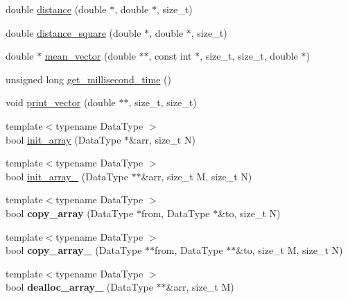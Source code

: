 \begin{DoxyCompactItemize}
\item 
double \hyperlink{namespaceSimpleCluster_a32994022b5f131b488b98d00fdb40a1f}{distance} (double $\ast$, double $\ast$, size\-\_\-t)
\item 
double \hyperlink{namespaceSimpleCluster_a2b7cf8225bcc829f7f0717292d49e0f0}{distance\-\_\-square} (double $\ast$, double $\ast$, size\-\_\-t)
\item 
double $\ast$ \hyperlink{namespaceSimpleCluster_a88d267f1612b952f290e0b3861360d53}{mean\-\_\-vector} (double $\ast$$\ast$, const int $\ast$, size\-\_\-t, size\-\_\-t, double $\ast$)
\item 
unsigned long \hyperlink{namespaceSimpleCluster_a00c790e51730b0e775438fe6c5ccc2c6}{get\-\_\-millisecond\-\_\-time} ()
\item 
void \hyperlink{namespaceSimpleCluster_ad04f5b6a882a4eea162fbf4eddc1246c}{print\-\_\-vector} (double $\ast$$\ast$, size\-\_\-t, size\-\_\-t)
\item 
{\footnotesize template$<$typename Data\-Type $>$ }\\bool \hyperlink{namespaceSimpleCluster_acc1dff4c68ab24c3054d8b0953c8f92d}{init\-\_\-array} (Data\-Type $\ast$\&arr, size\-\_\-t N)
\item 
{\footnotesize template$<$typename Data\-Type $>$ }\\bool \hyperlink{namespaceSimpleCluster_a3e85bbadb909b189b987f27b841ca220}{init\-\_\-array\-\_} (Data\-Type $\ast$$\ast$\&arr, size\-\_\-t M, size\-\_\-t N)
\item 
\hypertarget{namespaceSimpleCluster_a0639106c2ddf850801bd10f3ffb8de6f}{{\footnotesize template$<$typename Data\-Type $>$ }\\bool {\bfseries copy\-\_\-array} (Data\-Type $\ast$from, Data\-Type $\ast$\&to, size\-\_\-t N)}\label{namespaceSimpleCluster_a0639106c2ddf850801bd10f3ffb8de6f}

\item 
\hypertarget{namespaceSimpleCluster_a9bc5fb00d7a05159e5c7ba1b27e0273f}{{\footnotesize template$<$typename Data\-Type $>$ }\\bool {\bfseries copy\-\_\-array\-\_} (Data\-Type $\ast$$\ast$from, Data\-Type $\ast$$\ast$\&to, size\-\_\-t M, size\-\_\-t N)}\label{namespaceSimpleCluster_a9bc5fb00d7a05159e5c7ba1b27e0273f}

\item 
\hypertarget{namespaceSimpleCluster_a22acb50e58f0867d2ee468f7f395f691}{{\footnotesize template$<$typename Data\-Type $>$ }\\bool {\bfseries dealloc\-\_\-array\-\_} (Data\-Type $\ast$$\ast$\&arr, size\-\_\-t M)}\label{namespaceSimpleCluster_a22acb50e58f0867d2ee468f7f395f691}


\end{DoxyCompactItemize}
